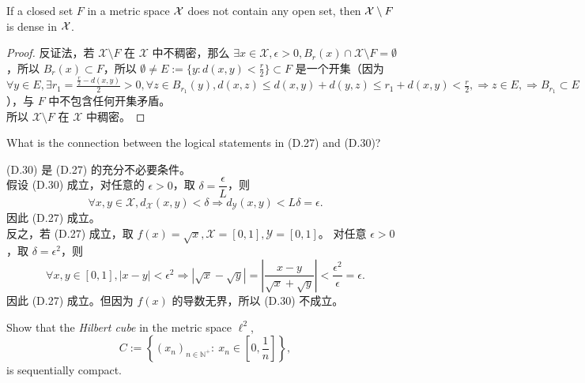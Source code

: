 \documentclass[lang=cn,a4paper,newtx,bibend=bibtex]{elegantpaper}
\begin{document}
\begin{prob}[D.52]
  If a closed set $F$ in a metric space ${\cal X}$
  does not contain any open set,
  then ${\cal X}\setminus F$ is dense in ${\cal X}$.
\end{prob}

\begin{proof}
反证法，若 $\mathcal{X}\setminus F$ 在 $\mathcal{X}$ 中不稠密，那么 $\exists x \in \mathcal{X}, \epsilon > 0, B_r(x) \cap \mathcal{X} \setminus F = \emptyset$，所以 $B_r(x) \subset F$，所以 $\emptyset \neq E:= \{y : d(x, y) < \frac{r}2\} \subset F$ 是一个开集（因为 $\forall y \in E, \exists r_1 = \frac{\frac{r}2 - d(x, y)}2 > 0, \forall z \in B_{r_1}(y), d(x,z) \leq d(x, y) + d(y, z) \leq r_1 + d(x, y) < \frac{r}2, \Rightarrow z \in E, \Rightarrow B_{r_1} \subset E $），与 $F$ 中不包含任何开集矛盾。\\所以 $\mathcal{X} \setminus F$ 在 $\mathcal{X}$ 中稠密。
\end{proof}

\begin{prob}[D.112]
  What is the connection between the logical statements in (D.27) and (D.30)?
\end{prob}

\begin{solution}
    (D.30) 是 (D.27) 的充分不必要条件。
\\
    假设 (D.30) 成立，对任意的 $\epsilon > 0$，取 $\delta = \dfrac{\epsilon}L$，则
    \begin{equation*}
        \forall x,y\in \mathcal{X}, d_{\mathcal{X}}(x,y)<\delta \Rightarrow d_{\mathcal{Y}}(x,y)<L\delta = \epsilon.
    \end{equation*}
    因此 (D.27) 成立。
\\
    反之，若 (D.27) 成立，取 $f(x) = \sqrt x, \mathcal{X} = [0,1], \mathcal{Y} = [0,1]$。
    对任意 $\epsilon > 0$，取 $\delta = \epsilon^2$，则
    \begin{equation*}
        \forall x,y\in [0,1], |x-y|<\epsilon^2 \Rightarrow |\sqrt x - \sqrt y| = \left|\dfrac{x-y}{\sqrt x + \sqrt y}\right| < \dfrac{\epsilon^2}{\epsilon} = \epsilon.
    \end{equation*}
    因此 (D.27) 成立。但因为 $f(x)$ 的导数无界，所以 (D.30) 不成立。
\end{solution}

\begin{prob}[D.137]
  Show that the \emph{Hilbert cube}
  in the metric space $\ell^2$, %
  \begin{equation*}
    C := \left\{
      (x_n)_{n\in \mathbb{N}^+}:\ x_n\in \left[0,\frac{1}{n}\right]
      \right\}, 
  \end{equation*}
  is sequentially compact.
\end{prob}
\end{document}
